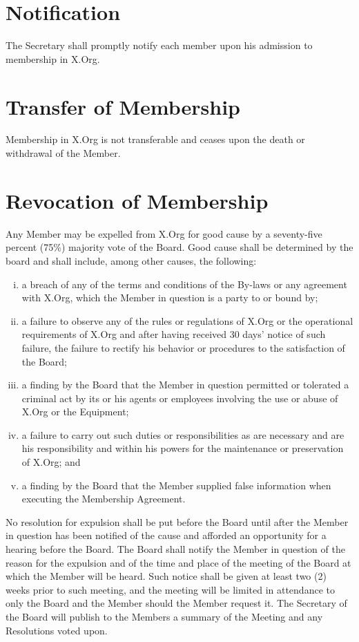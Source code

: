 \documentclass[10pt, english]{bylaws}
\begin{document}
\section{Notification}
The Secretary shall promptly notify each member upon his admission to membership
in X.Org.

\section{Transfer of Membership}
Membership in X.Org is not transferable and ceases upon the death or withdrawal
of the Member.

\section{Revocation of Membership}
Any Member may be expelled from X.Org for good cause by a seventy-five percent
(75\%) majority vote of the Board. Good cause shall be determined by the board
and shall include, among other causes, the following:

\begin{enumerate}[(i)\hspace{.2cm}]
	\item a breach of any of the terms and conditions of the By-laws or any
	agreement with X.Org, which the Member in question is a party to or
	bound by;

	\item a failure to observe any of the rules or regulations of X.Org or
	the operational requirements of X.Org and after having received 30
	days' notice of such failure, the failure to rectify his behavior or
	procedures to the satisfaction of the Board;

	\item a finding by the Board that the Member in question permitted or
	tolerated a criminal act by its or his agents or employees involving
	the use or abuse of X.Org or the Equipment;

	\item a failure to carry out such duties or responsibilities as are
	necessary and are his responsibility and within his powers for the
	maintenance or preservation of X.Org; and

	\item a finding by the Board that the Member supplied false information
	when executing the Membership Agreement.
\end{enumerate}

No resolution for expulsion shall be put before the Board until after the Member
in question has been notified of the cause and afforded an opportunity for a
hearing before the Board. The Board shall notify the Member in question of the
reason for the expulsion  and of the time and place of the meeting of the Board
at which the Member will be heard. Such notice shall be given at least two (2)
weeks prior to such meeting, and the meeting will be limited in attendance to
only the Board and the Member should the Member request it. The Secretary of the
Board will publish to the Members a summary of the Meeting and any Resolutions
voted upon.
\end{document}
